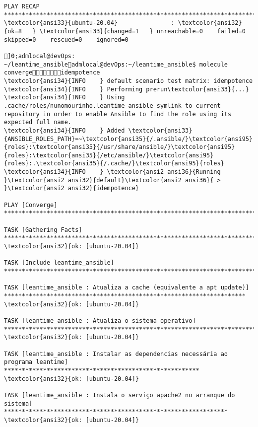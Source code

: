 \documentclass{scrartcl}
\begin{document}
\begin{Verbatim}
PLAY RECAP *******************************************************************************************************************************
\textcolor{ansi33}{ubuntu-20.04}               : \textcolor{ansi32}{ok=8   } \textcolor{ansi33}{changed=1   } unreachable=0    failed=0    skipped=0    rescued=0    ignored=0

]0;admlocal@devOps: ~/leantime_ansibleadmlocal@devOps:~/leantime_ansible$ molecule convergeidempotence
\textcolor{ansi34}{INFO    } default scenario test matrix: idempotence
\textcolor{ansi34}{INFO    } Performing prerun\textcolor{ansi33}{...}
\textcolor{ansi34}{INFO    } Using .cache/roles/nunomourinho.leantime_ansible symlink to current repository in order to enable Ansible to find the role using its expected full name.
\textcolor{ansi34}{INFO    } Added \textcolor{ansi33}{ANSIBLE_ROLES_PATH}=~\textcolor{ansi35}{/.ansible/}\textcolor{ansi95}{roles}:\textcolor{ansi35}{/usr/share/ansible/}\textcolor{ansi95}{roles}:\textcolor{ansi35}{/etc/ansible/}\textcolor{ansi95}{roles}:.\textcolor{ansi35}{/.cache/}\textcolor{ansi95}{roles}
\textcolor{ansi34}{INFO    } \textcolor{ansi2 ansi36}{Running }\textcolor{ansi2 ansi32}{default}\textcolor{ansi2 ansi36}{ > }\textcolor{ansi2 ansi32}{idempotence}

PLAY [Converge] **************************************************************************************************************************

TASK [Gathering Facts] *******************************************************************************************************************
\textcolor{ansi32}{ok: [ubuntu-20.04]}

TASK [Include leantime_ansible] **********************************************************************************************************

TASK [leantime_ansible : Atualiza a cache (equivalente a apt update)] ********************************************************************
\textcolor{ansi32}{ok: [ubuntu-20.04]}

TASK [leantime_ansible : Atualiza o sistema operativo] ***********************************************************************************
\textcolor{ansi32}{ok: [ubuntu-20.04]}

TASK [leantime_ansible : Instalar as dependencias necessária ao programa leantime] *******************************************************
\textcolor{ansi32}{ok: [ubuntu-20.04]}

TASK [leantime_ansible : Instala o serviço apache2 no arranque do sistema] ***************************************************************
\textcolor{ansi32}{ok: [ubuntu-20.04]}


\end{Verbatim}
\end{document}
